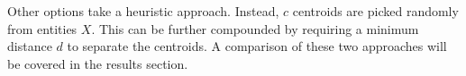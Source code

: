 Other options take a heuristic approach. Instead, $c$ centroids are picked randomly from entities $X$. This can be further compounded by requiring a minimum distance $d$ to separate the centroids. A comparison of these two approaches will be covered in the results section.





